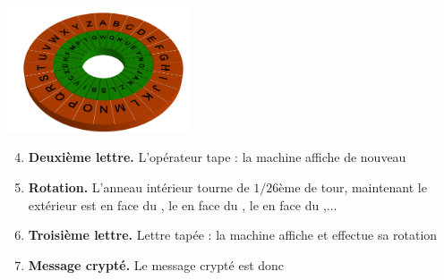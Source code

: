 \begin{frame}

{\centering 
   \qquad         \includegraphics[width=0.4\textwidth]{figures/Enigma_1_bi_unesurune.png} 
 \qquad    
{}
}


\pause

\begin{enumerate}\setcounter{enumi}{3}
%   
%   

  \item \textbf{Deuxième lettre.} L'opérateur tape  : 
  la machine affiche de nouveau 
\pause

  \item \textbf{Rotation.} L'anneau intérieur tourne de $1/26$ème de tour, maintenant le  extérieur 
  est en face du , le  en face du , le  en face du ,...
\pause

   \item \textbf{Troisième lettre.} Lettre tapée   : 
   la machine affiche  et effectue sa rotation
\pause

   \item \textbf{Message crypté.} Le message crypté est donc 
\end{enumerate}

\end{frame}



